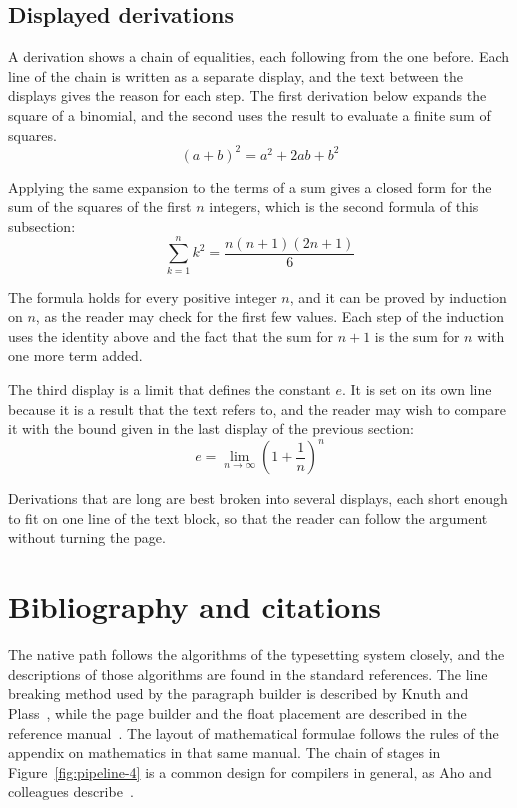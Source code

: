 \documentclass{article}
\begin{document}
\subsection{Displayed derivations}\label{sec:derivations-4}

A derivation shows a chain of equalities, each following from the one before. Each line
of the chain is written as a separate display, and the text between the displays gives
the reason for each step. The first derivation below expands the square of a binomial,
and the second uses the result to evaluate a finite sum of squares.
\[
  (a+b)^{2} = a^{2} + 2ab + b^{2}
\]

Applying the same expansion to the terms of a sum gives a closed form for the sum of the
squares of the first $n$ integers, which is the second formula of this subsection:
\[
  \sum_{k=1}^{n} k^{2} = \frac{n(n+1)(2n+1)}{6}
\]

The formula holds for every positive integer $n$, and it can be proved by induction on
$n$, as the reader may check for the first few values. Each step of the induction
uses the identity above and the fact that the sum for $n+1$ is the sum for $n$ with one
more term added.

The third display is a limit that defines the constant $e$. It is set on its own line
because it is a result that the text refers to, and the reader may wish to compare it
with the bound given in the last display of the previous section:
\[
  e = \lim_{n\to\infty} \left( 1 + \frac{1}{n} \right)^{n}
\]

Derivations that are long are best broken into several displays, each short enough to
fit on one line of the text block, so that the reader can follow the argument without
turning the page.

\section{Bibliography and citations}\label{sec:refs-4}

The native path follows the algorithms of the typesetting system closely, and the
descriptions of those algorithms are found in the standard references. The line
breaking method used by the paragraph builder is described by Knuth and
Plass~\cite{knuth81-4}, while the page builder and the float placement are described in
the reference manual~\cite{knuth86-4}. The layout of mathematical formulae follows the
rules of the appendix on mathematics in that same manual. The chain of stages in
Figure~\ref{fig:pipeline-4} is a common design for compilers in general, as Aho and
colleagues describe~\cite{aho06-4}.
\end{document}
